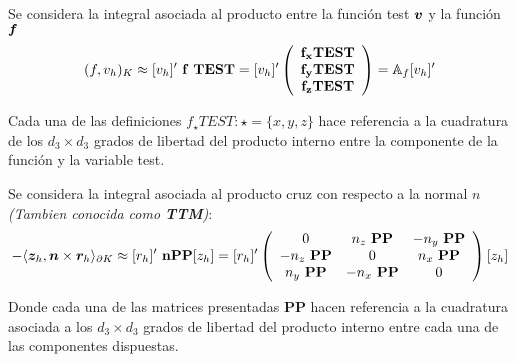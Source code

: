 \documentclass{article}
\begin{document}
\vspace{1mm}

\noindent Se considera la integral asociada al producto entre la función test $\boldsymbol{v}$ y la función $\boldsymbol{f}$ 
\begin{align}
    (f, v_h)_K \approx
    [v_h]'~\mathbf{f~TEST} = 
    [v_h]'
    \left(
    \begin{array}{ccc}
       \mathbf{ f_x TEST }\\
       \mathbf{ f_y TEST }\\
       \mathbf{ f_z TEST }\\
    \end{array}
    \right) = 
    \mathbb{A}_f
    [v_h]'
\end{align}

\noindent Cada una de las definiciones $f_\star TEST : \star = \lbrace x, y, z \rbrace$ hace referencia a la cuadratura de los $d_3 \times d_3$ grados de libertad del producto interno entre la componente de la función y la variable test.

\vspace{1mm}
\noindent Se considera la integral asociada al producto cruz con respecto a la normal $n$ \textit{(Tambien conocida como \textbf{TTM})}:
\begin{align}
    - \langle \boldsymbol{z}_h, \boldsymbol{n} \times \boldsymbol{r}_h \rangle_{\partial K}  \approx
    [r_h]'~\mathbf{nPP}[z_h] = 
    [r_h]'
    \left(
    \begin{array}{ccc}
        0 & n_z~\mathbf{PP} & -n_y~\mathbf{PP} \\
        -n_z~\mathbf{PP} & 0 & n_x~\mathbf{PP} \\
        n_y~\mathbf{PP} & -n_x~\mathbf{PP} & 0 \\
    \end{array}
    \right)
    [z_h]
\end{align}

\noindent Donde cada una de las matrices presentadas $\mathbf{PP}$ hacen referencia a la cuadratura asociada a los $d_3 \times d_3$ grados de libertad del producto interno entre cada una de las componentes dispuestas.
\vspace{1mm}
\end{document}
